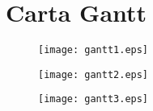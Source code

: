 \newpage
\section{Carta Gantt}
\label{appen:gantt}

%
%

\begin{figure}[H]
\centering
\texttt{[image: gantt1.eps]}
\label{fig:gantt1}
\end{figure}

\begin{figure}[htbp!]
\centering
\texttt{[image: gantt2.eps]}
\label{fig:gantt1}
\end{figure}

\begin{figure}[htbp!]
\centering
\texttt{[image: gantt3.eps]}
\label{fig:gantt1}
\end{figure}
